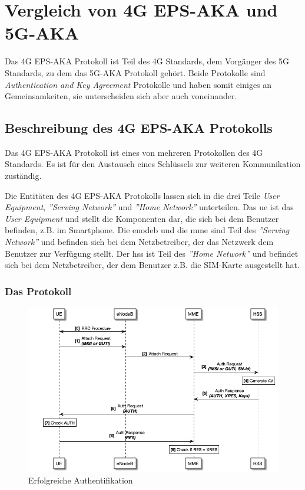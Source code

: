 \chapter{Vergleich von 4G EPS-AKA und 5G-AKA}
\label{chap:3}

Das 4G EPS-AKA Protokoll ist Teil des 4G Standards, dem Vorgänger des 5G Standards, zu dem das 5G-AKA Protokoll gehört.
Beide Protokolle sind \textit{Authentication and Key Agreement} Protokolle und haben somit einiges an Gemeinsamkeiten, sie unterscheiden sich aber auch voneinander.

\section{Beschreibung des 4G EPS-AKA Protokolls}

Das 4G EPS-AKA Protokoll ist eines von mehreren Protokollen des 4G Standards.
Es ist für den Austausch eines Schlüssels zur weiteren Kommunikation zuständig.

Die Entitäten des 4G EPS-AKA Protokolls lassen sich in die drei Teile \textit{User Equipment}, \textit{''Serving Network''} und \textit{''Home Network''} unterteilen.
Das \gls{ue} ist das \textit{User Equipment} und stellt die Komponenten dar, die sich bei dem Benutzer befinden, z.B. im Smartphone.
Die \gls{enodeb} und die \gls{mme} sind Teil des \textit{''Serving Network''} und befinden sich bei dem Netzbetreiber, der das Netzwerk dem Benutzer zur Verfügung stellt.
Der \gls{hss} ist Teil des \textit{''Home Network''} und befindet sich bei dem Netzbetreiber, der dem Benutzer z.B. die SIM-Karte ausgestellt hat. %

\subsection{Das Protokoll}

\begin{figure}[H]
  \centering
  \includegraphics[width=\textwidth]{uml/4g-protocol_v1.png}
  \caption{Erfolgreiche Authentifikation}
  \label{fig:protocol_v1}
\end{figure} %

